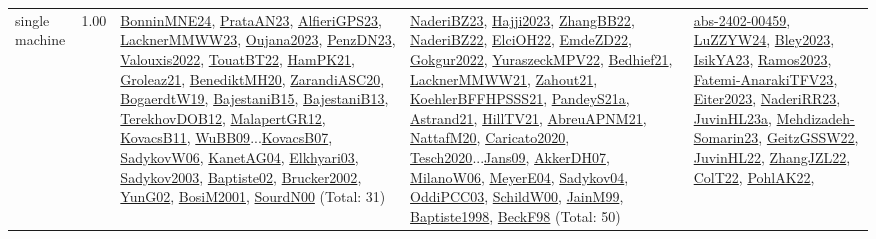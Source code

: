 {\begin{longtable}{p{3cm}r>{\raggedright\arraybackslash}p{6cm}>{\raggedright\arraybackslash}p{6cm}>{\raggedright\arraybackslash}p{8cm}}
\index{single machine}\index{Classification!single machine}single machine &  1.00 & \hyperref[detail:BonninMNE24]{BonninMNE24}, \hyperref[detail:PrataAN23]{PrataAN23}, \hyperref[detail:AlfieriGPS23]{AlfieriGPS23}, \hyperref[detail:LacknerMMWW23]{LacknerMMWW23}, \hyperref[detail:Oujana2023]{Oujana2023}, \hyperref[detail:PenzDN23]{PenzDN23}, \hyperref[detail:Valouxis2022]{Valouxis2022}, \hyperref[detail:TouatBT22]{TouatBT22}, \hyperref[detail:HamPK21]{HamPK21}, \hyperref[detail:Groleaz21]{Groleaz21}, \hyperref[detail:BenediktMH20]{BenediktMH20}, \hyperref[detail:ZarandiASC20]{ZarandiASC20}, \hyperref[detail:BogaerdtW19]{BogaerdtW19}, \hyperref[detail:BajestaniB15]{BajestaniB15}, \hyperref[detail:BajestaniB13]{BajestaniB13}, \hyperref[detail:TerekhovDOB12]{TerekhovDOB12}, \hyperref[detail:MalapertGR12]{MalapertGR12}, \hyperref[detail:KovacsB11]{KovacsB11}, \hyperref[detail:WuBB09]{WuBB09}...\hyperref[detail:KovacsB07]{KovacsB07}, \hyperref[detail:SadykovW06]{SadykovW06}, \hyperref[detail:KanetAG04]{KanetAG04}, \hyperref[detail:Elkhyari03]{Elkhyari03}, \hyperref[detail:Sadykov2003]{Sadykov2003}, \hyperref[detail:Baptiste02]{Baptiste02}, \hyperref[detail:Brucker2002]{Brucker2002}, \hyperref[detail:YunG02]{YunG02}, \hyperref[detail:BosiM2001]{BosiM2001}, \hyperref[detail:SourdN00]{SourdN00} (Total: 31) & \hyperref[detail:NaderiBZ23]{NaderiBZ23}, \hyperref[detail:Hajji2023]{Hajji2023}, \hyperref[detail:ZhangBB22]{ZhangBB22}, \hyperref[detail:NaderiBZ22]{NaderiBZ22}, \hyperref[detail:ElciOH22]{ElciOH22}, \hyperref[detail:EmdeZD22]{EmdeZD22}, \hyperref[detail:Gokgur2022]{Gokgur2022}, \hyperref[detail:YuraszeckMPV22]{YuraszeckMPV22}, \hyperref[detail:Bedhief21]{Bedhief21}, \hyperref[detail:LacknerMMWW21]{LacknerMMWW21}, \hyperref[detail:Zahout21]{Zahout21}, \hyperref[detail:KoehlerBFFHPSSS21]{KoehlerBFFHPSSS21}, \hyperref[detail:PandeyS21a]{PandeyS21a}, \hyperref[detail:Astrand21]{Astrand21}, \hyperref[detail:HillTV21]{HillTV21}, \hyperref[detail:AbreuAPNM21]{AbreuAPNM21}, \hyperref[detail:NattafM20]{NattafM20}, \hyperref[detail:Caricato2020]{Caricato2020}, \hyperref[detail:Tesch2020]{Tesch2020}...\hyperref[detail:Jans09]{Jans09}, \hyperref[detail:AkkerDH07]{AkkerDH07}, \hyperref[detail:MilanoW06]{MilanoW06}, \hyperref[detail:MeyerE04]{MeyerE04}, \hyperref[detail:Sadykov04]{Sadykov04}, \hyperref[detail:OddiPCC03]{OddiPCC03}, \hyperref[detail:SchildW00]{SchildW00}, \hyperref[detail:JainM99]{JainM99}, \hyperref[detail:Baptiste1998]{Baptiste1998}, \hyperref[detail:BeckF98]{BeckF98} (Total: 50) & \hyperref[detail:abs-2402-00459]{abs-2402-00459}, \hyperref[detail:LuZZYW24]{LuZZYW24}, \hyperref[detail:Bley2023]{Bley2023}, \hyperref[detail:IsikYA23]{IsikYA23}, \hyperref[detail:Ramos2023]{Ramos2023}, \hyperref[detail:Fatemi-AnarakiTFV23]{Fatemi-AnarakiTFV23}, \hyperref[detail:Eiter2023]{Eiter2023}, \hyperref[detail:NaderiRR23]{NaderiRR23}, \hyperref[detail:JuvinHL23a]{JuvinHL23a}, \hyperref[detail:Mehdizadeh-Somarin23]{Mehdizadeh-Somarin23}, \hyperref[detail:GeitzGSSW22]{GeitzGSSW22}, \hyperref[detail:JuvinHL22]{JuvinHL22}, \hyperref[detail:ZhangJZL22]{ZhangJZL22}, \hyperref[detail:ColT22]{ColT22}, \hyperref[detail:PohlAK22]{PohlAK22}, 
\end{longtable}}
